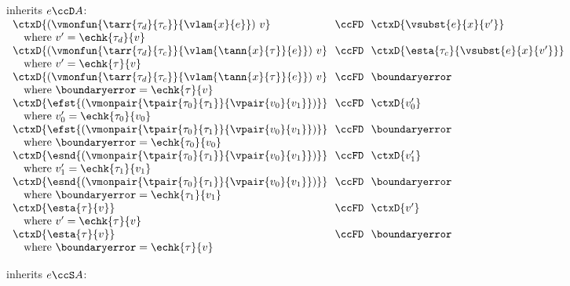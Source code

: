 \begin{flushleft}
\medskip
\begin{minipage}[t]{\columnwidth}
 inherits $e \ccD A$:\\
$\begin{array}{l@{~~}c@{~~}l}
  \ctxD{(\vmonfun{\tarr{\tau_d}{\tau_c}}{\vlam{x}{e}})~v} & \ccFD & \ctxD{\vsubst{e}{x}{v'}}
\\ \multicolumn{3}{l}{\mbox{\quad where $v' = \echk{\tau_d}{v}$}}
\\
  \ctxD{(\vmonfun{\tarr{\tau_d}{\tau_c}}{\vlam{\tann{x}{\tau}}{e}})~v} & \ccFD & \ctxD{\esta{\tau_c}{\vsubst{e}{x}{v'}}}
\\ \multicolumn{3}{l}{\mbox{\quad where $v' = \echk{\tau}{v}$}}
\\
  \ctxD{(\vmonfun{\tarr{\tau_d}{\tau_c}}{\vlam{\tann{x}{\tau}}{e}})~v} & \ccFD & \boundaryerror
\\ \multicolumn{3}{l}{\mbox{\quad where $\boundaryerror = \echk{\tau}{v}$}}
\\
  \ctxD{\efst{(\vmonpair{\tpair{\tau_0}{\tau_1}}{\vpair{v_0}{v_1}})}} & \ccFD & \ctxD{v_0'}
\\ \multicolumn{3}{l}{\mbox{\quad where $v_0' = \echk{\tau_0}{v_0}$}}
\\
  \ctxD{\efst{(\vmonpair{\tpair{\tau_0}{\tau_1}}{\vpair{v_0}{v_1}})}} & \ccFD & \boundaryerror
\\ \multicolumn{3}{l}{\mbox{\quad where $\boundaryerror = \echk{\tau_0}{v_0}$}}
\\
  \ctxD{\esnd{(\vmonpair{\tpair{\tau_0}{\tau_1}}{\vpair{v_0}{v_1}})}} & \ccFD & \ctxD{v_1'}
\\ \multicolumn{3}{l}{\mbox{\quad where $v_1' = \echk{\tau_1}{v_1}$}}
\\
  \ctxD{\esnd{(\vmonpair{\tpair{\tau_0}{\tau_1}}{\vpair{v_0}{v_1}})}} & \ccFD & \boundaryerror
\\ \multicolumn{3}{l}{\mbox{\quad where $\boundaryerror = \echk{\tau_1}{v_1}$}}
\\
  \ctxD{\esta{\tau}{v}} & \ccFD & \ctxD{v'}
\\ \multicolumn{3}{l}{\mbox{\quad where $v' = \echk{\tau}{v}$}}
\\
  \ctxD{\esta{\tau}{v}} & \ccFD & \boundaryerror
\\ \multicolumn{3}{l}{\mbox{\quad where $\boundaryerror = \echk{\tau}{v}$}}
\end{array}$
\end{minipage}%
\begin{minipage}[t]{\columnwidth}
 inherits $e \ccS A$:\\

\end{minipage}
\end{flushleft}
